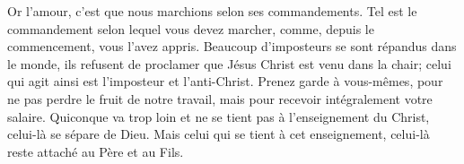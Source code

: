 Or l’amour, c’est que nous marchions selon ses commandements.
Tel est le commandement selon lequel vous devez marcher,
	comme, depuis le commencement, vous l’avez appris.
Beaucoup d’imposteurs se sont répandus dans le monde,
	ils refusent de proclamer que Jésus Christ est venu dans la chair;
	celui qui agit ainsi est l’imposteur et l’anti-Christ.
Prenez garde à vous-mêmes, pour ne pas perdre le fruit de notre travail,
	mais pour recevoir intégralement votre salaire.
Quiconque va trop loin et ne se tient pas à l’enseignement du Christ,
	celui-là se sépare de Dieu.
Mais celui qui se tient à cet enseignement,
	celui-là reste attaché au Père et au Fils.
